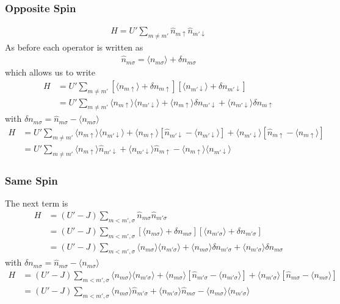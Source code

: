 \documentclass[11pt]{article}
\begin{document}
\subsubsection{Opposite Spin}
\begin{gather}
    H = U' \sum_{m \neq m'} \hat n_{m \uparrow}  \hat n_{m' \downarrow} 
\end{gather}
As before each operator is written as
\begin{gather}
    \hat n_{m\sigma} = \langle n_{m\sigma} \rangle + \delta n_{m \sigma}
\end{gather}
which allows us to write
\begin{align}
    H &= U' \sum_{m\neq m'} [\langle n_{m\uparrow} \rangle + \delta n_{m \uparrow}]
    [\langle n_{m'\downarrow} \rangle + \delta n_{m' \downarrow}] \\\nonumber
    &= U' \sum_{m \neq m'} \langle n_{m \uparrow}\rangle \langle n_{m' \downarrow}\rangle 
    + \langle n_{m\uparrow}\rangle \delta n_{m' \downarrow} + \langle n_{m' \downarrow}\rangle \delta n_{m \uparrow}
\end{align}
with $\delta n_{m\sigma} = \hat n_{m\sigma} - \langle n_{m\sigma}\rangle$
\begin{align}
    H &= U' \sum_{m\neq m'} \langle n_{m \uparrow}\rangle \langle n_{m' \downarrow}\rangle
    + \langle n_{m \uparrow}\rangle [\hat n_{m' \downarrow} - \langle n_{m'\downarrow}\rangle]
    + \langle n_{m'\downarrow}\rangle [\hat n_{m\uparrow} - \langle n_{m\uparrow}\rangle] \\\nonumber
    &= U' \sum_{m \neq m'} \langle n_{m\uparrow}\rangle \hat n_{m'\downarrow}
    + \langle n_{m' \downarrow}\rangle \hat n_{m\uparrow} 
    -\langle n_{m \uparrow}\rangle \langle n_{m' \downarrow}\rangle
\end{align}
\subsubsection{Same Spin}
The next term is
\begin{align}
    H &= (U'-J) \sum_{m < m', \sigma} \hat n_{m\sigma} \hat n_{m' \sigma} \\\nonumber
      &= (U'-J) \sum_{m < m', \sigma} [\langle n_{m \sigma}\rangle + \delta n_{m\sigma}][\langle n_{m'\sigma}\rangle + \delta n_{m'\sigma}]\\\nonumber
      &= (U'-J) \sum_{m < m', \sigma} \langle n_{m\sigma}\rangle\langle n_{m'\sigma}\rangle
      + \langle n_{m\sigma}\rangle \delta n_{m' \sigma} + \langle n_{m'\sigma}\rangle\delta n_{m\sigma}
\end{align}
with $\delta n_{m\sigma} = \hat n_{m\sigma} - \langle n_{m\sigma}\rangle$
\begin{align}
    H &= (U'-J) \sum_{m < m', \sigma} \langle n_{m\sigma}\rangle\langle n_{m'\sigma}\rangle
      + \langle n_{m\sigma}\rangle [\hat n_{m'\sigma} - \langle n_{m'\sigma}\rangle] 
      + \langle n_{m'\sigma}\rangle[\hat n_{m\sigma} - \langle n_{m\sigma}\rangle] \\\nonumber
      &= (U'-J) \sum_{m < m', \sigma} \langle n_{m\sigma} \rangle \hat n_{m'\sigma}
      + \langle n_{m' \sigma} \rangle \hat n_{m \sigma}
      - \langle n_{m\sigma} \rangle \langle n_{m' \sigma} \rangle
\end{align}
\end{document}
